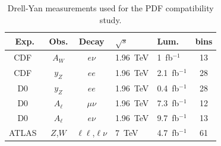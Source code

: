 \begin{table}[!tbp]
  \begin{center}
    \begin{tabular}{cccllc}
\hline \hline
Exp.                       & Obs.     & Decay    & $\sqrt{s}$ & Lum.           & bins \\
\hline
CDF~\cite{CDF:2009cjw}     & $A_W$    & $e\nu$   & 1.96~TeV   & 1~fb$^{-1}$    & 13 \\ %
CDF~\cite{CDF:2010vek}     & $y_Z$    & $ee$     & 1.96~TeV   & 2.1~fb$^{-1}$  & 28 \\ %
\hline
D0~\cite{D0:2007djv}       & $y_Z$    & $ee$     & 1.96~TeV   & 0.4~fb$^{-1}$  & 28 \\ %
D0~\cite{D0:2013xqc}       & $A_\ell$ & $\mu\nu$ & 1.96~TeV   & 7.3~fb$^{-1}$  & 12 \\ %
D0~\cite{D0:2014kma}       & $A_\ell$ & $e\nu$   & 1.96~TeV   & 9.7~fb$^{-1}$  & 13 \\ %
\hline
ATLAS~\cite{ATLAS:2016nqi} & $Z$,$W$ & $\ell\ell$,$\ell\nu$ & 7~TeV & 4.7~fb$^{-1}$ & 61 \\ %
\hline \hline
\end{tabular}
    \caption{Drell-Yan measurements used for the PDF compatibility study.
    } 
      \label{tab:datasets} 
\end{center}
\end{table}

